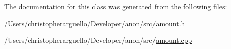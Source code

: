 The documentation for this class was generated from the following files\+:\begin{DoxyCompactItemize}
\item 
/\+Users/christopherarguello/\+Developer/anon/src/\mbox{\hyperlink{amount_8h}{amount.\+h}}\item 
/\+Users/christopherarguello/\+Developer/anon/src/\mbox{\hyperlink{amount_8cpp}{amount.\+cpp}}\end{DoxyCompactItemize}
